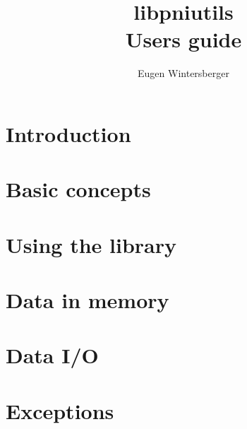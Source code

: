 \documentclass[a4paper,twoside]{book}
\author{Eugen Wintersberger}
\title{{\Huge libpniutils\\ Users guide}}
\begin{document}
\maketitle
\tableofcontents

\chapter{Introduction}\label{chapter:introduction}


\chapter{Basic concepts}\label{chapter:basics}


\chapter{Using the library}\label{chapter:usage}


\chapter{Data in memory}\label{chapter:data_in_memory}


\chapter{Data I/O}\label{chapter:io}

\chapter{Exceptions}\label{chapter:exceptions}
\end{document}
